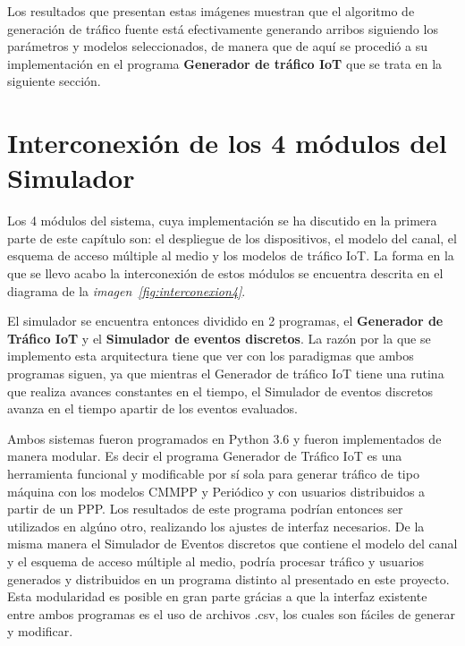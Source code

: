 Los resultados que presentan estas imágenes muestran que el algoritmo de generación de tráfico fuente está efectivamente generando arribos siguiendo los parámetros y modelos seleccionados, de manera que de aquí se procedió a su implementación en el programa \textbf{Generador de tráfico IoT} que se trata en la siguiente sección. \newline

\hfill

\break


\section{Interconexión de los 4 módulos del Simulador}

Los 4 módulos del sistema, cuya implementación se ha discutido en la primera parte de este capítulo son: el despliegue de los dispositivos, el modelo del canal, el esquema de acceso múltiple al medio y los modelos de tráfico IoT. La forma en la que se llevo acabo la interconexión de estos módulos se encuentra descrita en el diagrama de la \textit{imagen~\ref{fig:interconexion4}}. \newline

El simulador se encuentra entonces dividido en 2 programas, el \textbf{Generador de Tráfico IoT} y el \textbf{Simulador de eventos discretos}. La razón por la que se implemento esta arquitectura tiene que ver con los paradigmas que ambos programas siguen, ya que mientras el Generador de tráfico IoT tiene una rutina que realiza avances constantes en el tiempo, el Simulador de eventos discretos avanza en el tiempo apartir de los eventos evaluados. \newline

Ambos sistemas fueron programados en Python 3.6 y fueron implementados de manera modular. Es decir el programa Generador de Tráfico IoT es una herramienta funcional y modificable por sí sola para generar tráfico de tipo máquina con los modelos CMMPP y Periódico y con usuarios distribuidos a partir de un PPP. Los resultados de este programa podrían entonces ser utilizados en algúno otro, realizando los ajustes de interfaz necesarios. De la misma manera el Simulador de Eventos discretos que contiene el modelo del canal y el esquema de acceso múltiple al medio, podría procesar tráfico y usuarios generados y distribuidos en un programa distinto al presentado en este proyecto. Esta modularidad es posible en gran parte grácias a que la interfaz existente entre ambos programas es el uso de archivos .csv, los cuales son fáciles de generar y modificar.\newline

